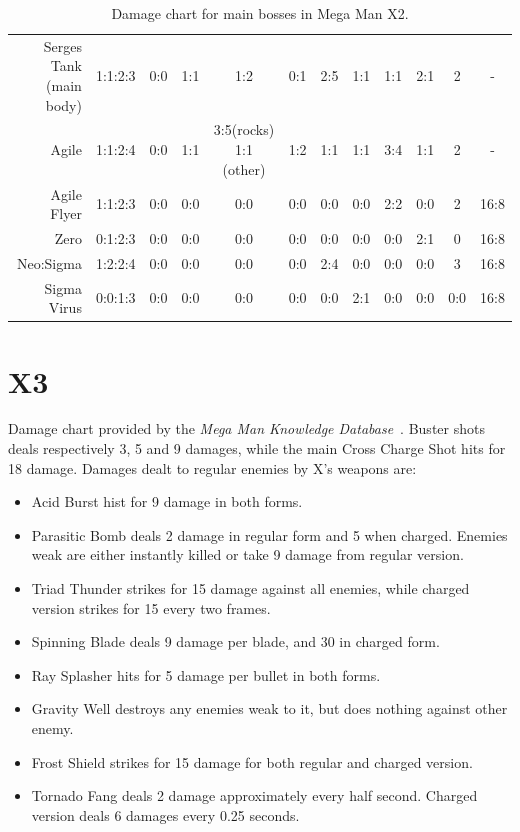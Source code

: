 \begin{table}[htp]
{\begin{tabular}{r *{11}{c}}
			\makecell[rt]{Serges Tank\\(main body)}&1:1:2:3	&0:0&1:1&1:2&0:1&2:5&1:1&1:1&2:1&2 	&- \\
			Agile& 		1:1:2:4&0:0	&1:1&\makecell[ct]{3:5(rocks)\\1:1 (other)} 	&1:2 		&1:1 	&1:1 	&3:4 	&1:1 		&2 	&-\\
			Agile Flyer&1:1:2:3	&0:0&0:0&0:0&0:0&0:0&0:0&2:2&0:0&2 	&16:8 \\
			Zero&0:1:2:3&0:0&0:0&0:0&0:0&0:0&0:0&0:0&2:1&0&16:8\\
			Neo:Sigma& 1:2:2:4&0:0&0:0&0:0&0:0&2:4&0:0&0:0&0:0&3&16:8 \\
			Sigma Virus& 0:0:1:3&0:0&0:0&0:0&0:0&0:0&2:1&0:0&0:0&0:0&16:8\\
			\bottomrule
		\end{tabular}
	}	
	\caption{Damage chart for main bosses in Mega Man X2.}
\end{table}

\section{X3}
Damage chart provided by the \emph{Mega Man Knowledge Database}~\cite{wiki:damage_chart_X3}. Buster shots deals respectively 3, 5 and 9 damages, while the main Cross Charge Shot hits for  18 damage.
Damages dealt to regular enemies by X's weapons are:
\begin{itemize}
	\item Acid Burst hist for 9 damage in both forms.
	\item Parasitic Bomb deals 2 damage in regular form and 5 when charged. Enemies weak are either instantly killed or take 9 damage from regular version.
	\item Triad Thunder strikes for 15 damage against all enemies, while charged version strikes for 15 every two frames.
	\item Spinning Blade deals 9 damage per blade, and 30 in charged form.
	\item Ray Splasher hits for 5 damage per bullet in both forms.
	\item Gravity Well destroys any enemies weak to it, but does nothing against other enemy.
	\item Frost Shield strikes for 15 damage for both regular and charged version.
	\item Tornado Fang deals 2 damage approximately every half second. Charged version deals 6 damages every 0.25 seconds.
\end{itemize}

